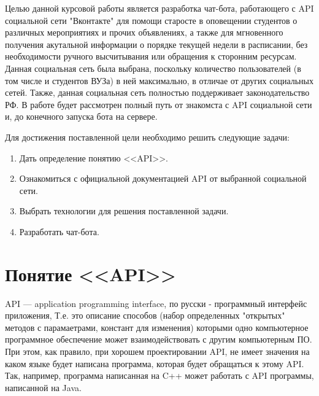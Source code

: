 \documentclass[bachelor, och, coursework, times]{SCWorks}
\begin{document}
\term{} %

\practtype{}

\duration{} %

\practStart{}  %
\practFinish{} %


\MakeTitle


\tableofcontents

\intro

Целью данной курсовой работы является разработка чат-бота, работающего с API социальной сети "Вконтакте" для помощи
старосте в оповещении студентов о различных мероприятиях и прочих объявлениях, 
а также для мгновенного получения акутальной информации о порядке текущей недели в расписании,
без необходимости ручного высчитывания или обращения к сторонним ресурсам.
Данная социальная сеть была выбрана, поскольку количество пользователей (в том числе и студентов ВУЗа) в ней максимально,
в отличае от других социальных сетей. Также, данная социальная сеть полностью поддерживает законодательство РФ.
В работе будет рассмотрен полный путь от знакомста с API социальной сети и, до конечного запуска бота на сервере.

Для достижения поставленной цели необходимо решить следующие задачи: 
\begin {enumerate}
	\item Дать определение понятию <<API>>.
	\item Ознакомиться с официальной документацией API от выбранной социальной сети.
	\item Выбрать технологии для решения поставленной задачи.
	\item Разработать чат-бота.
\end {enumerate}
\section{Понятие <<API>>}
API --- application programming interface, по русски - программный интерфейс приложения,
Т.е. это описание способов (набор определенных "открытых" методов с парамаетрами, констант для изменения)
которыми одно компьютерное программное обеспечение может взаимодействовать с другим компьютерным ПО. При этом, как правило, 
при хорошем проектировании API, не имеет значения на каком языке будет написана программа, которая будет обращаться к этому API. Так, например,
программа написанная на C++ может работать с API программы, написанной на Java.
\end{document}

